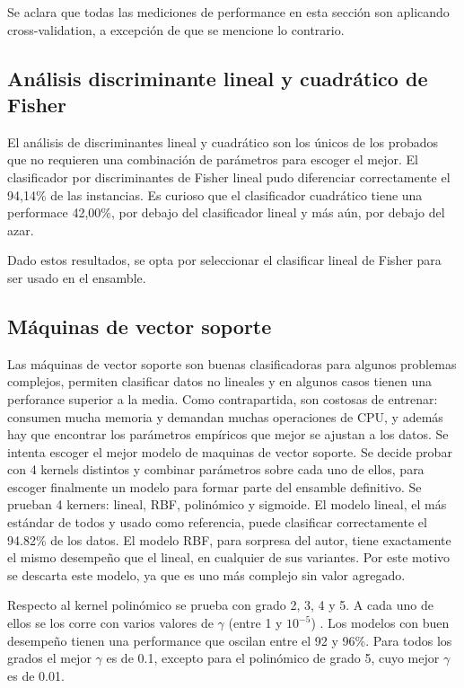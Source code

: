 \documentclass[journal]{IEEEtran}
\begin{document}
Se aclara que todas las mediciones de performance en esta
sección son aplicando cross-validation, a excepción de que se mencione lo
contrario.

\subsection{Análisis discriminante lineal y cuadrático de Fisher}
El análisis de discriminantes lineal y cuadrático son los únicos de los probados
que no requieren una combinación de parámetros para escoger el mejor. El
clasificador por discriminantes de Fisher lineal pudo diferenciar correctamente
el 94,14\% de las instancias. Es curioso que el clasificador cuadrático tiene
una performace 42,00\%, por debajo del clasificador lineal y más aún, por debajo
del azar. 

Dado estos resultados, se opta por seleccionar el clasificar lineal de Fisher
para ser usado en el ensamble.

\subsection{Máquinas de vector soporte}
Las máquinas de vector soporte son buenas clasificadoras para algunos problemas complejos, permiten
clasificar datos no lineales y en algunos casos tienen una perforance superior a la media.
Como contrapartida, son costosas de entrenar: consumen mucha  memoria y
demandan muchas operaciones de CPU, y además hay que encontrar
los parámetros empíricos que mejor se ajustan a los datos.  
Se intenta escoger el mejor modelo de maquinas de vector soporte. Se
decide probar con 4 kernels distintos y combinar parámetros sobre
cada uno de ellos, para escoger finalmente un modelo para formar parte
del ensamble definitivo. Se prueban 4 kerners: lineal, RBF, polinómico y
sigmoide. El modelo lineal, el más estándar de todos y usado como referencia,
puede clasificar correctamente el 94.82\% de los datos. El modelo RBF, para
sorpresa del autor, tiene exactamente el mismo desempeño que el lineal, 
en cualquier de sus variantes. Por este motivo se descarta este modelo,
ya que es uno más complejo sin valor agregado. 

Respecto al kernel polinómico se prueba con grado 2, 3, 4 y 5. A cada
uno de ellos se los corre con varios valores de $\gamma$ (entre 1 y $10^{-5}$) . Los modelos
con buen desempeño tienen una performance que oscilan entre el 92 y
96\%. Para todos los grados el mejor $\gamma$ es de 0.1, excepto para el polinómico
de grado 5, cuyo mejor $\gamma$ es de 0.01. 
\end{document}
